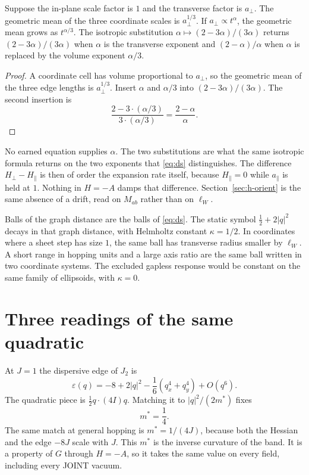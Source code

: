 \begin{proposition}
\label{prop:avol}
Suppose the in-plane scale factor is \(1\) and the transverse factor is
\(a_\perp\).
The geometric mean of the three coordinate scales is \(a_\perp^{1/3}\).
If \(a_\perp\propto t^\alpha\), the geometric mean grows as \(t^{\alpha/3}\).
The isotropic substitution
\(\alpha\mapsto(2-3\alpha)/(3\alpha)\)
returns \((2-3\alpha)/(3\alpha)\) when \(\alpha\) is the transverse exponent
and \((2-\alpha)/\alpha\) when \(\alpha\) is replaced by the volume exponent
\(\alpha/3\).
\end{proposition}

\begin{proof}
A coordinate cell has volume proportional to \(a_\perp\), so the geometric
mean of the three edge lengths is \(a_\perp^{1/3}\).
Insert \(\alpha\) and \(\alpha/3\) into \((2-3\alpha)/(3\alpha)\).
The second insertion is
\[
\frac{2-3\cdot(\alpha/3)}{3\cdot(\alpha/3)}=\frac{2-\alpha}{\alpha}.
\]
\end{proof}

No earned equation supplies \(\alpha\).
The two substitutions are what the same isotropic formula returns on the
two exponents that \eqref{eq:ds} distinguishes.
The difference \(H_\perp-H_\parallel\) is then of order the expansion rate
itself, because \(H_\parallel=0\) while \(a_\parallel\) is held at \(1\).
Nothing in \(H=-A\) damps that difference.
Section~\ref{sec:h-orient} is the same absence of a drift, read on
\(M_{ab}\) rather than on \(\ell_W\).

Balls of the graph distance are the balls of \eqref{eq:ds}.
The static symbol \(\tfrac12+2|q|^2\) decays in that graph distance, with
Helmholtz constant \(\kappa=1/2\).
In coordinates where a sheet step has size \(1\), the same ball has
transverse radius smaller by \(\ell_W\).
A short range in hopping units and a large axis ratio are the same ball
written in two coordinate systems.
The excluded gapless response would be constant on the same family of
ellipsoids, with \(\kappa=0\).

\section{Three readings of the same quadratic}
\label{sec:masses}

At \(J=1\) the dispersive edge of \(J_2\) is
\[
\varepsilon(q)=-8+2|q|^2-\frac16(q_x^4+q_y^4)+O(q^6).
\]
The quadratic piece is \(\tfrac12 q\cdot(4I)q\).
Matching it to \(|q|^2/(2m^*)\) fixes
\begin{equation}
\label{eq:mstar}
m^*=\frac14.
\end{equation}
The same match at general hopping is \(m^*=1/(4J)\), because both the
Hessian and the edge \(-8J\) scale with \(J\).
This \(m^*\) is the inverse curvature of the band.
It is a property of \(G\) through \(H=-A\), so it takes the same value on
every field, including every JOINT vacuum.

